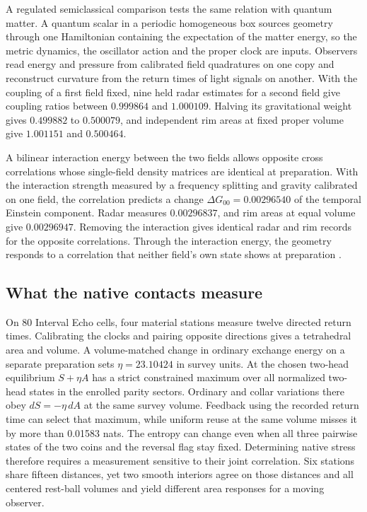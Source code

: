 \documentclass[11pt]{article}
\theoremstyle{definition}
\theoremstyle{remark}
\begin{document}
A regulated semiclassical comparison tests the same relation with
quantum matter. A quantum scalar in a periodic homogeneous box sources
geometry through one Hamiltonian containing the expectation of the
matter energy, so the metric dynamics, the oscillator action and the
proper clock are inputs. Observers read energy and pressure from
calibrated field quadratures on one copy and reconstruct curvature from
the return times of light signals on another. With the coupling of a
first field fixed, nine held radar estimates for a second field give
coupling ratios between $0.999864$ and $1.000109$. Halving its
gravitational weight gives $0.499882$ to $0.500079$, and independent rim
areas at fixed proper volume give $1.001151$ and $0.500464$.

A bilinear interaction energy between the two fields allows opposite
cross correlations whose single-field density matrices are identical at
preparation. With the interaction strength measured by a frequency
splitting and gravity calibrated on one field, the correlation predicts a change $\Delta G_{00}=0.00296540$ of the temporal
Einstein component. Radar measures $0.00296837$, and rim areas at equal
volume give $0.00296947$. Removing the interaction gives identical radar
and rim records for the opposite correlations. Through the interaction energy,
the geometry responds to a correlation that neither field's own state
shows at preparation \cite{ophEinstein}.

\subsection{What the native contacts measure}
\label{sec:einstein-native}

On 80 Interval Echo cells, four material stations measure twelve directed
return times. Calibrating the clocks and pairing opposite directions gives
a tetrahedral area and volume. A volume-matched change in ordinary exchange
energy on a separate preparation sets $\eta=23.10424$ in survey units.
At the chosen two-head equilibrium $S+\eta A$ has a strict constrained
maximum over all normalized two-head states in the enrolled parity sectors. Ordinary and collar
variations there obey $dS=-\eta\,dA$ at the same survey volume.
Feedback using the recorded return time can select that maximum, while
uniform reuse at the same volume misses it by more than 0.01583 nats.
The entropy can change even when all three
pairwise states of the two coins and the reversal flag stay fixed.
Determining native stress therefore requires a measurement sensitive to
their joint correlation. Six stations share fifteen distances, yet two
smooth interiors agree on those distances and all centered rest-ball
volumes and yield different area responses for a moving observer.
\end{document}
